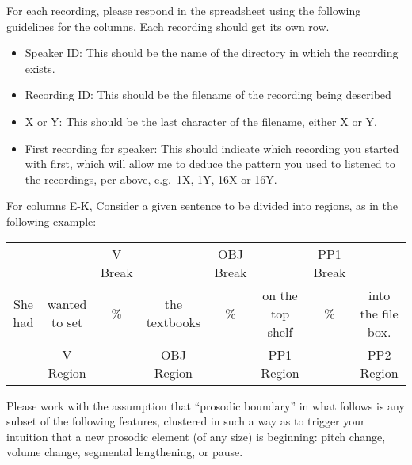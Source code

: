 \documentclass[11pt,oneside]{book}
\providecommand{\tightlist}{%
  \setlength{\itemsep}{0pt}\setlength{\parskip}{0pt}}
\begin{document}
For each recording, please respond in the spreadsheet using the following guidelines for the columns. Each recording should get its own row.

\begin{itemize}
\tightlist
\item
  Speaker ID: This should be the name of the directory in which the recording exists.
\item
  Recording ID: This should be the filename of the recording being described
\item
  X or Y: This should be the last character of the filename, either X or Y.
\item
  First recording for speaker: This should indicate which recording you started with first, which will allow me to deduce the pattern you used to listened to the recordings, per above, e.g.~1X, 1Y, 16X or 16Y.
\end{itemize}

For columns E-K, Consider a given sentence to be divided into regions, as in the following example:

\begingroup
  \setlength{\tabcolsep}{1pt}
  \begin{tabular}{cccccccc}
    & & \footnotesize V Break & & \footnotesize OBJ Break & & \footnotesize PP1 Break & \\
    She had & wanted to set & \% & the textbooks & \% & on the top shelf & \% & into the file box. \\
    \cmidrule(r){2-2} \cmidrule(r){4-4} \cmidrule(r){6-6} \cmidrule(r){8-8} 
    & \footnotesize V Region & & \footnotesize OBJ Region & & \footnotesize PP1 Region & & PP2 Region \\
  \end{tabular}
\endgroup

Please work with the assumption that ``prosodic boundary'' in what follows is any subset of the following features, clustered in such a way as to trigger your intuition that a new prosodic element (of any size) is beginning: pitch change, volume change, segmental lengthening, or pause.
\end{document}

